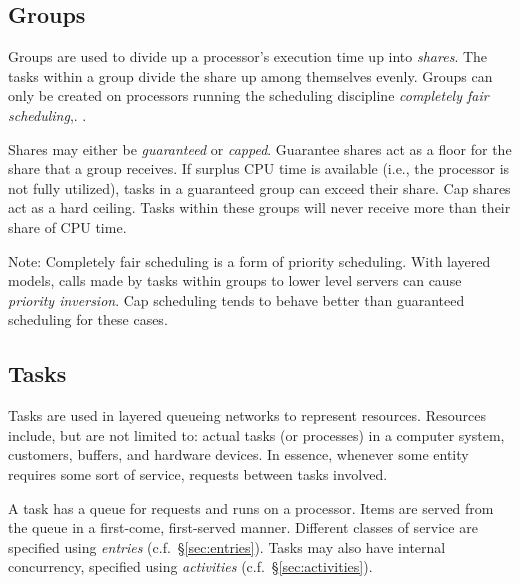 \subsection{Groups}
\label{sec:groups}

Groups\cite{perf:li-2009-mascots-fairshare} are used to divide up a processor's
execution time up into \emph{shares}.  The tasks within a group divide the share up among
themselves evenly.  Groups can only be created on processors running the scheduling discipline
\emph{completely fair scheduling},.  .

Shares may either be \emph{guaranteed} or \emph{capped}.  Guarantee
shares act as a floor for the share that a group receives.  If surplus CPU time is available (i.e., the
processor is not fully utilized), tasks in a guaranteed group can exceed their share.
Cap shares act as a hard ceiling.  Tasks within these groups will never receive more than their share of CPU
time.  

Note: Completely fair scheduling is a form of priority scheduling.  With layered
models, calls made by tasks within groups to lower level servers can cause \emph{priority
  inversion}.  Cap scheduling tends to behave better than guaranteed scheduling
for these cases.

\subsection{Tasks}
\label{sec:tasks}

Tasks are used in layered queueing networks to
represent resources.  Resources include, but are not limited to:
actual tasks (or processes) in a computer system,
customers, buffers, and hardware
devices.  In essence, whenever some entity requires some sort of
service, requests between tasks involved.

A task has a queue for requests and runs on a
processor.  Items are served from the queue in a first-come,
first-served manner.  Different classes of
service are specified using
\emph{entries} (c.f.~\S\ref{sec:entries}).  Tasks may
also have internal concurrency, specified using
\emph{activities} (c.f.~\S\ref{sec:activities}).

